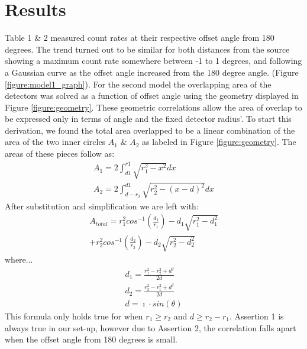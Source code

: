 \documentclass[12pt, letterpaper, twocolumn]{article}
\begin{document}
\section{Results}
Table 1 \& 2 measured count rates at their respective offset angle from 180
degrees. The trend turned out to be similar for both distances from the source
showing a maximum count rate somewhere between -1 to 1 degrees, and following a
Gaussian curve as the offset angle increased from the 180 degree angle.
(Figure \ref{figure:model1_graph}). \setlength{\parskip}{6pt} For the second
model the overlapping area of the detectors was solved as a function of offset
angle using the geometry displayed in Figure \ref{figure:geometry}. These
geometric correlations allow the area of overlap to be expressed only in terms
of angle and the fixed detector radius'. To start this derivation, we found the
total area overlapped to be a linear combination of the area of the two inner
circles $A_{1}$ \& $A_{2}$ as labeled in Figure \ref{figure:geometry}. The areas
of these pieces follow as:
\begin{equation}
  \begin{gathered}
   A_{1} = 2\int_{d1}^{r1}\sqrt{r_{1}^{2}-x^{2}}dx \nonumber\\
   A_{2} = 2\int_{d-r_{2}}^{d1}\sqrt{r_{2}^{2}-(x-d)^{2}}dx \nonumber
  \end{gathered}
\end{equation}
After substitution and simplification we are left with:
\begin{equation}
  \begin{aligned}
  A_{total}=r_{1}^{2}cos^{-1}(\frac{d_{1}}{r_{1}})−d_{1}\sqrt{r_{1}^{2}−d_{1}^
  {2}}\\+r_{2}^{2}cos^{-1}(\frac{d_{2}}{r_{2}})−d_{2}\sqrt{r_{2}^{2}−d_{2}^{2}}
  \nonumber
  \end{aligned}
\end{equation}
where...
\begin{equation}
  \begin{aligned}
  d_{1} = \frac{r_{1}^{2}-r_{2}^{2}+d^{2}}{2d} \nonumber \\ d_{2} =
  \frac{r_{2}^{2}-r_{1}^{2}+d^{2}}{2d} \nonumber \\ d = \imath \cdot sin(\theta)
  \end{aligned}
\end{equation}
This formula only holds true for when $r_{1}\geq r_{2}$ and $d \geq r_{2} -
r_{1}$. Assertion 1 is always true in our set-up, however due to Assertion 2,
the correlation falls apart when the offset angle from 180 degrees is small.
\end{document}
